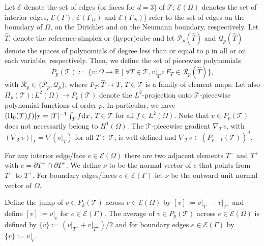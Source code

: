 \documentclass[10pt]{article}
\numberwithin{equation}{section}
\theoremstyle{plain}
\theoremstyle{definition}
\theoremstyle{remark}
\begin{document}
Let ${\mathcal{E}}$ denote the set of edges (or faces for $d=3$) of ${\mathcal{T}}$; ${\mathcal{E}}(\Omega)$ denotes the set of interior edges, ${\mathcal{E}}(\Gamma)$, ${\mathcal{E}}(\Gamma_D)$ and ${\mathcal{E}}(\Gamma_N)$) refer to the set of edges on the boundary of $\Omega$, on the Dirichlet and on the Neumann boundary, respectively.
Let $\hat{T}$, denote the reference simplex or (hyper)cube and let $\mathcal{P}_p(\hat{T})$ and $\mathcal{Q}_p(\hat{T})$ denote the spaces of polynomials of degree less than or equal to $p$ in all or on each variable, respectively. Then, we define the set of piecewise polynomials
\begin{equation*}
P_p({\mathcal{T}}) := \{v:\Omega\rightarrow \mathbb{R}\;\vert \;\forall T\in{\mathcal{T}},v\vert_T\circ F_{T}\in\mathcal{R}_p(\hat{T})\},
\end{equation*}
with $\mathcal{R}_p\in\{\mathcal{P}_p,\mathcal{Q}_p\}$, where $F_T:\hat{T}\to T$, $T\in{\mathcal{T}}$ is a family of element maps. Let also $\Pi_p({\mathcal{T}}):L^2(\Omega)\rightarrow P_p({\mathcal{T}})$ denote the $L^2$-projection onto ${\mathcal{T}}$-piecewise polynomial functions of order $p$. In particular, we have ${(\Pi_0({\mathcal{T}}) f)\vert_T=|T|^{-1}\int_T f{\operatorname*{d}\hspace{-0.3ex}x}}$, $T\in{\mathcal{T}}$ for all $f\in L^2(\Omega)$. 
Note that $v\in P_p({\mathcal{T}})$ does not necessarily belong to $H^1(\Omega)$. The ${\mathcal{T}}$-piecewise gradient $\nabla_{\mathcal{T}} v$, with $(\nabla_{\mathcal{T}} v)\vert_T=\nabla (v\vert_T)$ for all $T\in{\mathcal{T}}$, is well-defined and $\nabla_{\mathcal{T}} v\in (P_{p-1}({\mathcal{T}}))^d$.

For any interior edge/face $e\in{\mathcal{E}}(\Omega)$ there are two adjacent elements $T^-$ and $T^+$ with $e=\partial T^-\cap\partial T^+$. We define $\nu$ to be the normal vector of $e$ that points from $T^-$ to $T^+$. For boundary edges/faces $e\in\mathcal{E}(\Gamma)$ let $\nu$ be the outward unit normal vector of $\Omega$.

Define the jump of $v\in P_k({\mathcal{T}})$ across $e\in{\mathcal{E}}(\Omega)$ by $[v]:=v\vert_{T^-}-v\vert_{T^+}$ and define $[v]:=v\vert_{e}$ for $e\in{\mathcal{E}}(\Gamma)$. The average of $v\in P_p({\mathcal{T}})$ across $e\in{\mathcal{E}}(\Omega)$ is defined by $\{ v\}:=(v\vert_{T^-}+v\vert_{T^+})/2$ and for boundary edges $e\in{\mathcal{E}}(\Gamma)$ by $\{ v\}:=v\vert_e$.
\end{document}
